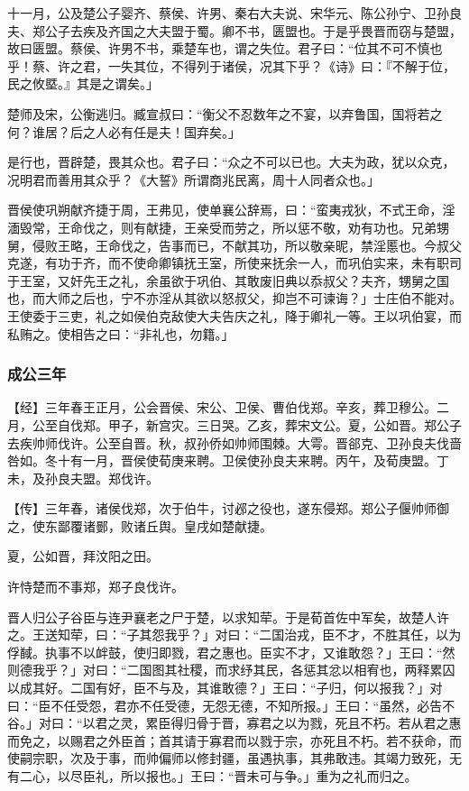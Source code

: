 \documentclass[]{article}
\begin{document}
十一月，公及楚公子婴齐、蔡侯、许男、秦右大夫说、宋华元、陈公孙宁、卫孙良夫、郑公子去疾及齐国之大夫盟于蜀。卿不书，匮盟也。于是乎畏晋而窃与楚盟，故曰匮盟。蔡侯、许男不书，乘楚车也，谓之失位。君子曰：``位其不可不慎也乎！蔡、许之君，一失其位，不得列于诸侯，况其下乎？《诗》曰：『不解于位，民之攸塈。』其是之谓矣。」

楚师及宋，公衡逃归。臧宣叔曰：``衡父不忍数年之不宴，以弃鲁国，国将若之何？谁居？后之人必有任是夫！国弃矣。」

是行也，晋辟楚，畏其众也。君子曰：``众之不可以已也。大夫为政，犹以众克，况明君而善用其众乎？《大誓》所谓商兆民离，周十人同者众也。」

晋侯使巩朔献齐捷于周，王弗见，使单襄公辞焉，曰：``蛮夷戎狄，不式王命，淫湎毁常，王命伐之，则有献捷，王亲受而劳之，所以惩不敬，劝有功也。兄弟甥舅，侵败王略，王命伐之，告事而已，不献其功，所以敬亲昵，禁淫慝也。今叔父克遂，有功于齐，而不使命卿镇抚王室，所使来抚余一人，而巩伯实来，未有职司于王室，又奸先王之礼，余虽欲于巩伯、其敢废旧典以忝叔父？夫齐，甥舅之国也，而大师之后也，宁不亦淫从其欲以怒叔父，抑岂不可谏诲？」士庄伯不能对。王使委于三吏，礼之如侯伯克敌使大夫告庆之礼，降于卿礼一等。王以巩伯宴，而私贿之。使相告之曰：``非礼也，勿籍。」

\hypertarget{header-n1548}{%
\subsubsection{成公三年 }\label{header-n1548}}

【经】三年春王正月，公会晋侯、宋公、卫侯、曹伯伐郑。辛亥，葬卫穆公。二月，公至自伐郑。甲子，新宫灾。三日哭。乙亥，葬宋文公。夏，公如晋。郑公子去疾帅师伐许。公至自晋。秋，叔孙侨如帅师围棘。大雩。晋郤克、卫孙良夫伐啬咎如。冬十有一月，晋侯使荀庚来聘。卫侯使孙良夫来聘。丙午，及荀庚盟。丁未，及孙良夫盟。郑伐许。

【传】三年春，诸侯伐郑，次于伯牛，讨邲之役也，遂东侵郑。郑公子偃帅师御之，使东鄙覆诸鄤，败诸丘舆。皇戌如楚献捷。

夏，公如晋，拜汶阳之田。

许恃楚而不事郑，郑子良伐许。

晋人归公子谷臣与连尹襄老之尸于楚，以求知荦。于是荀首佐中军矣，故楚人许之。王送知荦，曰：``子其怨我乎？」对曰：``二国治戎，臣不才，不胜其任，以为俘馘。执事不以衅鼓，使归即戮，君之惠也。臣实不才，又谁敢怨？」王曰：``然则德我乎？」对曰：``二国图其社稷，而求纾其民，各惩其忿以相宥也，两释累囚以成其好。二国有好，臣不与及，其谁敢德？」王曰：``子归，何以报我？」对曰：``臣不任受怨，君亦不任受德，无怨无德，不知所报。」王曰：``虽然，必告不谷。」对曰：``以君之灵，累臣得归骨于晋，寡君之以为戮，死且不朽。若从君之惠而免之，以赐君之外臣首；首其请于寡君而以戮于宗，亦死且不朽。若不获命，而使嗣宗职，次及于事，而帅偏师以修封疆，虽遇执事，其弗敢违。其竭力致死，无有二心，以尽臣礼，所以报也。」王曰：``晋未可与争。」重为之礼而归之。
\end{document}
